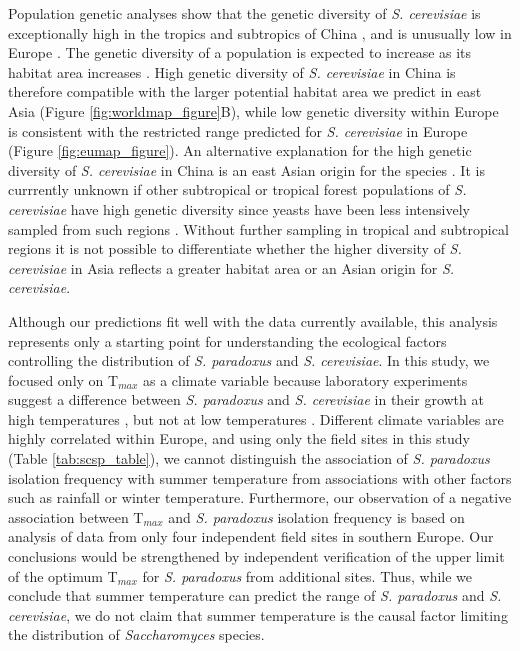 \documentclass[12pt]{article}
\begin{document}
\begin{linenumbers}
Population genetic analyses show that the genetic diversity of \textit{S. cerevisiae} is exceptionally high in the tropics and subtropics of China \citep{wang_surprisingly_2012,almeida_population_2015}, and is unusually low in Europe \citep{almeida_population_2015}. The genetic diversity of a population is expected to increase as its habitat area increases \citep{rauch_estimating_2005}. High genetic diversity of \textit{S. cerevisiae} in China is therefore compatible with the larger potential habitat area we predict in east Asia (Figure \ref{fig:worldmap_figure}B), while low genetic diversity within Europe is consistent with the restricted range predicted for \textit{S. cerevisiae} in Europe (Figure \ref{fig:eumap_figure}). An alternative explanation for the high genetic diversity of \textit{S. cerevisiae} in China is an east Asian origin for the species \citep{wang_surprisingly_2012,almeida_population_2015}. It is currrently unknown if other subtropical or tropical forest populations of \textit{S. cerevisiae} have high genetic diversity since yeasts have been less intensively sampled from such regions \citep{robert_yeast_2006,kurtzman_advances_2015}. Without further sampling in tropical and subtropical regions it is not possible to differentiate whether the higher diversity of \textit{S. cerevisiae} in Asia reflects a greater habitat area or an Asian origin for \textit{S. cerevisiae}.

Although our predictions fit well with the data currently available, this analysis represents only a starting point for understanding the ecological factors controlling the distribution of \textit{S. paradoxus} and \textit{S. cerevisiae}. In this study, we focused only on T$_{max}$ as a climate variable because laboratory experiments suggest a difference between \textit{S. paradoxus} and \textit{S. cerevisiae} in their growth at high temperatures \citep{sweeney_sympatric_2004,liti_population_2009,salvado_temperature_2011,leducq_local_2014}, but not at low temperatures \citep{sweeney_sympatric_2004,will_incipient_2010,salvado_temperature_2011}. Different climate variables are highly correlated within Europe, and using only the field sites in this study (Table \ref{tab:scsp_table}), we cannot distinguish the association of \textit{S. paradoxus} isolation frequency with summer temperature from associations with other factors such as rainfall or winter temperature. Furthermore, our observation of a negative association between T$_{max}$ and \textit{S. paradoxus} isolation frequency is based on analysis of data from only four independent field sites in southern Europe. Our conclusions would be strengthened by independent verification of the upper limit of the optimum T$_{max}$ for \textit{S. paradoxus} from additional sites. Thus, while we conclude that summer temperature can predict the range of \textit{S. paradoxus} and \textit{S. cerevisiae}, we do not claim that summer temperature is the causal factor limiting the distribution of \textit{Saccharomyces} species.


\end{linenumbers}
\end{document}
